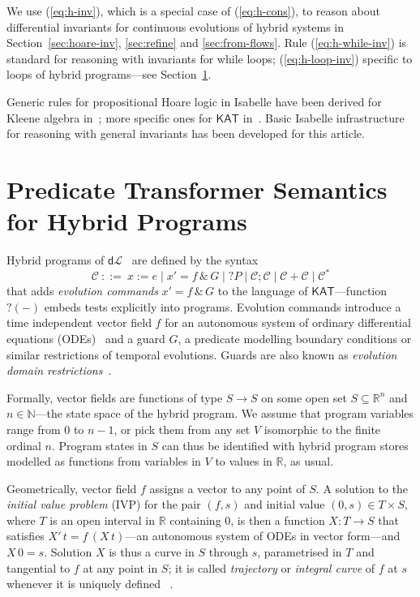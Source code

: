 \documentclass[envcountsames]{llncs}
\newcommand{\KAT}{\mathsf{KAT}}
\newcommand{\dL}{\mathsf{d}\mathcal{L}}
\newcommand{\reals}{\mathbb{R}}
\begin{document}
We use (\ref{eq:h-inv}), which is a special case of (\ref{eq:h-cons}),
to reason about differential invariants for continuous evolutions of
hybrid systems in Section~\ref{sec:hoare-inv}, \ref{sec:refine} and
\ref{sec:from-flows}. Rule (\ref{eq:h-while-inv}) is standard for
reasoning with invariants for while loops; (\ref{eq:h-loop-inv})
specific to loops of hybrid programs---see
Section~\ref{sec:sta-hybrid}.

Generic rules for propositional Hoare logic in Isabelle have been
derived for Kleene algebra in~\cite{afp:ka}; more specific ones for
$\KAT$ in~\cite{afp:kat,afp:vericomp}. Basic Isabelle infrastructure for
reasoning with general invariants has been developed for this
article. 



\section{Predicate Transformer Semantics for Hybrid Programs}\label{sec:sta-hybrid}

Hybrid programs of $\dL$~\cite{Platzer10} are defined by the syntax
\begin{equation*}
\mathcal{C}\ ::= \ x:=e \mid x' = f \, \&\, G \mid ?P\mid \mathcal{C};\mathcal{C}\mid \mathcal{C}+\mathcal{C}\mid \mathcal{C}^*
\end{equation*}
that adds \emph{evolution commands} $x' = f \, \&\, G$ to the language
of $\KAT$---function $?(-)$ embeds tests explicitly into programs.
Evolution commands introduce a time independent vector field $f$ for
an autonomous system of ordinary differential equations
(ODEs)~\cite{Hirsch09,Teschl12} and a guard $G$, a predicate modelling
boundary conditions or similar restrictions of temporal
evolutions. Guards are also known as \emph{evolution domain
  restrictions}~\cite{DoyenFPP18}.

Formally, vector fields are functions of type $S\to S$ on some open set
$S\subseteq \reals^n$ and $n\in\mathbb{N}$---the state space of
the hybrid program. We assume that program variables range from $0$ to
$n-1$, or pick them from any set $V$ isomorphic to the finite ordinal
$n$. Program states in $S$ can thus be identified with hybrid program
stores modelled as functions from variables in $V$ to values in
$\reals$, as usual.

Geometrically, vector field $f$ assigns a vector to any point of
$S$. A solution to the \emph{initial value problem} (IVP) for the pair
$(f,s)$ and initial value $(0,s)\in T\times S$, where $T$ is an open
interval in $\reals$ containing $0$, is then a function $X:T\to S$
that satisfies $X'\, t = f\, (X\, t)$---an autonomous system of ODEs
in vector form---and $X\, 0 = s$. Solution
$X$ is thus a curve in $S$ through $s$, parametrised in $T$ and
tangential to $f$ at any point in $S$; it is called \emph{trajectory}
or \emph{integral curve} of $f$ at $s$ whenever it is uniquely
defined ~\cite{Hirsch09,Teschl12}.
\end{document}
